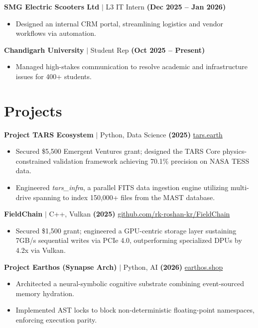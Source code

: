 \documentclass[9pt,a4paper]{extarticle}
\begin{document}
\begin{minipage}[t]{0.63\textwidth}
\textbf{SMG Electric Scooters Ltd} $|$ L3 IT Intern \textbf{(Dec 2025 -- Jan 2026)}
\begin{itemize}[leftmargin=12pt, itemsep=1pt, parsep=0pt]
    \item Designed an internal CRM portal, streamlining logistics and vendor workflows via automation.
\end{itemize}
\vspace{2.5mm}

\textbf{Chandigarh University} $|$ Student Rep \textbf{(Oct 2025 -- Present)}
\begin{itemize}[leftmargin=12pt, itemsep=1pt, parsep=0pt]
    \item Managed high-stakes communication to resolve academic and infrastructure issues for 400+ students.
\end{itemize}

\section{Projects}
\textbf{Project TARS Ecosystem} $|$ Python, Data Science \textbf{(2025)} \href{https://tars.earth}{tars.earth}
\begin{itemize}[leftmargin=12pt, itemsep=1pt, parsep=0pt]
    \item Secured \$5,500 Emergent Ventures grant; designed the TARS Core physics-constrained validation framework achieving 70.1\% precision on NASA TESS data.
    \item Engineered \textit{tars\_infra}, a parallel FITS data ingestion engine utilizing multi-drive spanning to index 150,000+ files from the MAST database.
\end{itemize}
\vspace{2mm}

\textbf{FieldChain} $|$ C++, Vulkan \textbf{(2025)} \href{https://github.com/rk-roshan-kr/FieldChain}{github.com/rk-roshan-kr/FieldChain}
\begin{itemize}[leftmargin=12pt, itemsep=1pt, parsep=0pt]
    \item Secured \$1,500 grant; engineered a GPU-centric storage layer sustaining 7GB/s sequential writes via PCIe 4.0, outperforming specialized DPUs by 4.2x via Vulkan.
\end{itemize}
\vspace{2mm}

\textbf{Project Earthos (Synapse Arch)} $|$ Python, AI \textbf{(2026)} \href{https://earthos.shop}{earthos.shop}
\begin{itemize}[leftmargin=12pt, itemsep=1pt, parsep=0pt]
    \item Architected a neural-symbolic cognitive substrate combining event-sourced memory hydration.
    \item Implemented AST locks to block non-deterministic floating-point namespaces, enforcing execution parity.
\end{itemize}


\end{minipage}
\end{document}
